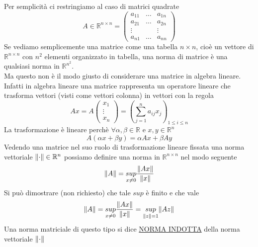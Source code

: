\documentclass[12pt,a4paper]{article}
\DeclarePairedDelimiter{\norma}{\lVert}{\rVert}
\begin{document}
Per semplicità ci restringiamo al caso di matrici quadrate
\begin{equation*}
    A\in \mathbb{R}^{n\times n}=\begin{pmatrix}
 a_{11} & \dots  & a_{1n}\\ 
 a_{21} & \dots  & a_{2n}\\ 
 \vdots &  & \vdots\\ 
 a_{n1} & \dots  & a_{nn} 
\end{pmatrix}
\end{equation*}
Se vediamo semplicemente una matrice come una tabella $n \times n$, cioè un vettore di $\mathbb{R}^{n \times n}$ con $n^2$ elementi organizzato in tabella, una norma di matrice è una qualsiasi norma in $\mathbb{R}^{n^2}$. \\
Ma questo non è il modo giusto di considerare una matrice in algebra lineare.\\
Infatti in algebra lineare una matrice rappresenta un operatore lineare che trasforma vettori (visti come vettori colonna) in vettori con la regola
\begin{equation*}
    Ax=A\begin{pmatrix}
        x_1\\
        \vdots\\
        x_n
    \end{pmatrix}
    =(\sum_{j=1}^na_{ij}x_j)_{1\leq i\leq n}
\end{equation*}
La trasformazione è lineare perchè $\forall\alpha,\beta\in\mathbb{R}$ e $x,y\in\mathbb{R}^n$
\begin{equation*}
    A(\alpha x+\beta y)=\alpha Ax+\beta Ay
\end{equation*}
Vedendo una matrice nel suo ruolo di trasformazione lineare fissata una norma vettoriale $\norma{\cdot}
\in \mathbb{R}^n$ possiamo definire una norma in $\mathbb{R}^{n\times n}$ nel modo seguente 
\begin{equation*}
    \norma{A}=\underset{x\neq0}{sup}\frac{\norma{Ax}}{\norma{x}}
\end{equation*}
Si può dimostrare (non richiesto) che tale $sup$ è finito e che vale
\begin{equation*}
    \norma{A}=\underset{x\neq0}{sup}\frac{\norma{Ax}}{\norma{x}}=\underset{\norma{z}=1}{sup}\norma{Az}
\end{equation*}
Una norma matriciale di questo tipo si dice \underline{NORMA INDOTTA} della norma vettoriale $\norma{\cdot}$
\end{document}
